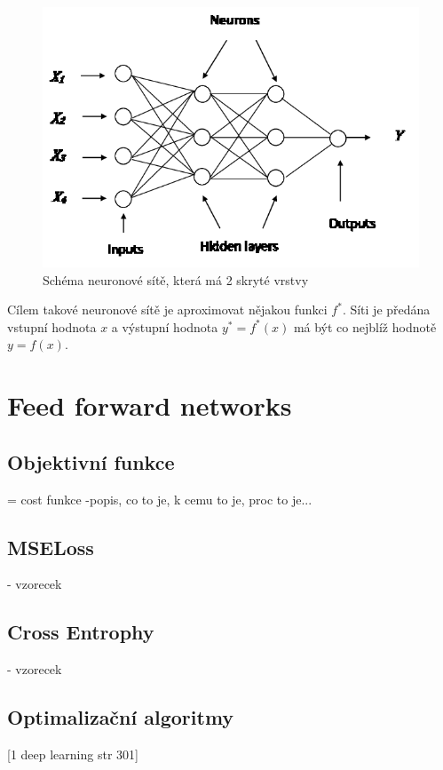 \begin{figure}[H]
    \centering
    \includegraphics[scale=1.3]{obrazky-figures/mlp.png}
    \caption{\label{fig:mlp}Schéma neuronové sítě, která má 2 skryté vrstvy}
\end{figure}

Cílem takové neuronové sítě je aproximovat nějakou funkci $f^\ast$. Síti je předána vstupní hodnota $x$ a výstupní hodnota $y^\ast = f^\ast(x)$ má být co nejblíž hodnotě $y = f(x)$.






\section{Feed forward networks}



\subsection{Objektivní funkce}
= cost funkce
-popis, co to je, k cemu to je, proc to je...

\subsection*{MSELoss}
- vzorecek
\subsection*{Cross Entrophy}
- vzorecek


\subsection{Optimalizační algoritmy}
 [1 deep learning str 301]

